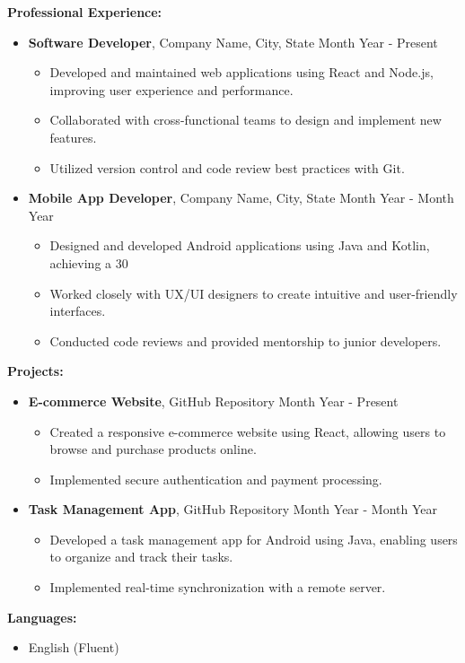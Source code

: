 \documentclass[a4paper,10pt]{article}
\begin{document}
\begin{flushleft}
    \textbf{Professional Experience:}
\end{flushleft}

\begin{itemize}
    \item \textbf{Software Developer}, Company Name, City, State \hfill Month Year - Present
    \begin{itemize}
        \item Developed and maintained web applications using React and Node.js, improving user experience and performance.
        \item Collaborated with cross-functional teams to design and implement new features.
        \item Utilized version control and code review best practices with Git.
    \end{itemize}

    \item \textbf{Mobile App Developer}, Company Name, City, State \hfill Month Year - Month Year
    \begin{itemize}
        \item Designed and developed Android applications using Java and Kotlin, achieving a 30%
        \item Worked closely with UX/UI designers to create intuitive and user-friendly interfaces.
        \item Conducted code reviews and provided mentorship to junior developers.
    \end{itemize}
\end{itemize}

\begin{flushleft}
    \textbf{Projects:}
\end{flushleft}

\begin{itemize}
    \item \textbf{E-commerce Website}, GitHub Repository \hfill Month Year - Present
    \begin{itemize}
        \item Created a responsive e-commerce website using React, allowing users to browse and purchase products online.
        \item Implemented secure authentication and payment processing.
    \end{itemize}

    \item \textbf{Task Management App}, GitHub Repository \hfill Month Year - Month Year
    \begin{itemize}
        \item Developed a task management app for Android using Java, enabling users to organize and track their tasks.
        \item Implemented real-time synchronization with a remote server.
    \end{itemize}
\end{itemize}

\begin{flushleft}
    \textbf{Languages:}
\end{flushleft}

\begin{itemize}
    \item English (Fluent)
\end{itemize}
\end{document}
